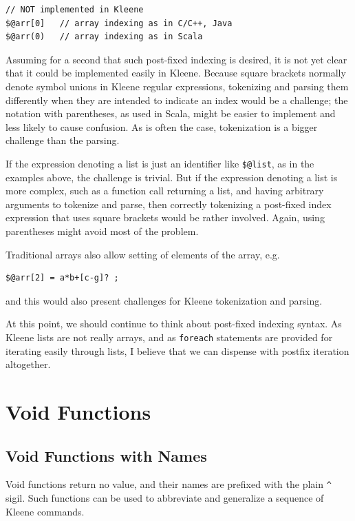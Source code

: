\documentclass[letterpaper,12pt]{article}
\begin{document}
\begin{Verbatim}[fontsize=\small]
// NOT implemented in Kleene
$@arr[0]   // array indexing as in C/C++, Java
$@arr(0)   // array indexing as in Scala
\end{Verbatim}

\noindent
Assuming for a second that such post-fixed indexing is desired, it is not yet
clear that it could be implemented easily in Kleene.
Because square brackets normally denote symbol unions in Kleene regular
expressions, tokenizing and
parsing them differently when they are intended to indicate an index would be a
challenge; the notation with parentheses, as used in Scala, might be easier to
implement and
less likely to cause confusion.  As is often the case, tokenization is a bigger
challenge than the parsing.

If the expression denoting a list is just an
identifier like \verb!$@list!, as in the examples above, the challenge is trivial.  But if the
expression denoting a list is more complex, such as a function call returning a list,
and having arbitrary arguments to tokenize and parse, then correctly tokenizing a
post-fixed index expression that uses square brackets would be rather involved.
Again, using parentheses might avoid most of the problem.

Traditional arrays also allow setting of elements of the array, e.g.

\begin{Verbatim}[fontsize=\small]
$@arr[2] = a*b+[c-g]? ;
\end{Verbatim}

\noindent
and this would also present challenges for Kleene tokenization and parsing.

At this point, we should continue to think about post-fixed indexing
syntax.  As Kleene lists are not really arrays, and as \texttt{foreach}
statements are provided for iterating easily through lists, I believe
that we can dispense with postfix iteration altogether.


\section{Void Functions}

\subsection{Void Functions with Names}

Void functions return no value, and their names are
prefixed with the plain \verb!^!
sigil.  Such functions can be used to abbreviate and generalize a
sequence of Kleene commands.
\end{document}
